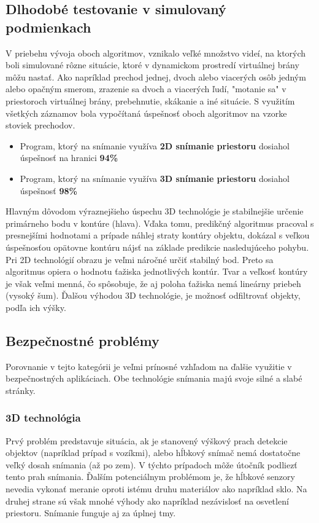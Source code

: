 \subsection{Dlhodobé testovanie v simulovaný podmienkach}
V priebehu vývoja oboch algoritmov, vznikalo veľké množstvo videí, na ktorých boli simulované rôzne situácie, ktoré v dynamickom prostredí virtuálnej brány môžu nastať. Ako napríklad prechod jednej, dvoch alebo viacerých osôb jedným alebo opačným smerom, zrazenie sa dvoch a viacerých ľudí, "motanie sa" v priestoroch virtuálnej brány, prebehnutie, skákanie a iné situácie. S využitím všetkých záznamov bola vypočítaná úspešnosť oboch algoritmov na vzorke stoviek prechodov.    



\begin{itemize}
\item Program, ktorý na snímanie využíva \textbf{2D snímanie priestoru} dosiahol úspešnosť na hranici \textbf{94\%}
\item Program, ktorý na snímanie využíva \textbf{3D snímanie priestoru} dosiahol úspešnosť \textbf{98\%}
\end{itemize}

Hlavným dôvodom výraznejšieho úspechu 3D technológie je stabilnejšie určenie primárneho bodu v kontúre (hlava). Vďaka tomu, predikčný algoritmus pracoval s presnejšími hodnotami a prípade náhlej straty kontúry objektu, dokázal s veľkou úspešnosťou opätovne kontúru nájsť na základe predikcie nasledujúceho pohybu. Pri 2D technológií obrazu je veľmi náročné určiť stabilný bod. Preto sa algoritmus opiera o hodnotu ťažiska jednotlivých kontúr. Tvar a veľkosť kontúry je však veľmi menná, čo spôsobuje, že aj poloha ťažiska nemá lineárny priebeh (vysoký šum). Ďalšou výhodou 3D technológie, je možnosť odfiltrovať objekty, podľa ich výšky.

\vspace{5mm}


\subsection{Bezpečnostné problémy}
Porovnanie v tejto kategórii je veľmi prínosné vzhľadom na ďalšie využitie v bezpečnostných aplikáciach. Obe technológie snímania majú svoje silné a slabé stránky.
\subsubsection{3D technológia}
Prvý problém predstavuje situácia, ak je stanovený výškový prach detekcie objektov (napríklad prípad s vozíkmi), alebo hĺbkový snímač nemá dostatočne veľký dosah snímania (až po zem). V týchto prípadoch môže útočník podliezť tento prah snímania. Ďalším potenciálnym problémom je, že hĺbkové senzory nevedia vykonať meranie oproti istému druhu materiálov ako napríklad sklo. Na druhej strane sú však mnohé výhody ako napríklad  nezávislosť na osvetlení priestoru. Snímanie funguje aj za úplnej tmy. 

